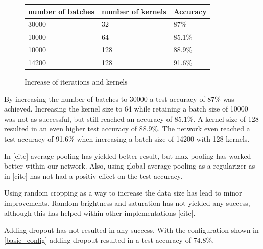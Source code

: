 \documentclass{article}
\begin{document}
\begin{enumerate}
\begin{enumerate}
\begin{item}
\begin{figure}
			\quad
			\begin{subtable}[b]{0.4\textwidth}
				\begin{tabular}{lll}
        					\toprule
        					number of batches & number of kernels    & Accuracy \\
        					\midrule
        					30000  & 32 & 87\%  \\
        					10000  & 64 & 85.1\%  \\
					10000 &128 & 88.9\%  \\
					14200  & 128 & 91.6\%  \\
					\bottomrule
     				\end{tabular}
				\caption{Increase of iterations and kernels}
				\label{kernels}
			\end{subtable}
		\end{figure}
		
			By increasing the number of batches to 30000 a test accuracy of 87\% was achieved. Increasing the kernel size to 64 while retaining a batch size of 10000 was not as successful, but still reached an accuracy of 85.1\%. A kernel size of 128 resulted in an even higher test accuracy of 88.9\%. The network even reached a test accuracy of  91.6\% when increasing a batch size of 14200 with 128 kernels.
		\end{item}
		
		
		
		
		\begin{item}
			In [cite] average pooling has yielded better result, but max pooling has worked better within our network.
			Also, using global average pooling as a regularizer as in [cite] has not had a positiv effect on the test accuracy.
			
		\end{item}
		
		
		
		\begin{item}
			Using random cropping as a way to increase the data size has lead to minor improvements. 
			Random brightness and saturation has not yielded any success, although this has helped within other implementations [cite].
		\end{item}
		
		
		
		\begin{item}
			Adding dropout has not resulted in any success. With the configuration shown in  \ref{basic_config} adding dropout resulted in a test accuracy of 74.8\%.
		\end{item}
		

\end{enumerate}
\end{enumerate}
\end{document}
